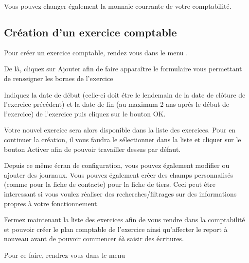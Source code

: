 \documentclass[a4paper,10pt,oneside,french]{sphinxmanual}
\begin{document}
Vous pouvez changer également la monnaie courrante de votre comptabilité.


\subsection{Création d’un exercice comptable}
\label{\detokenize{accounting/fiscalyear:creation-d-un-exercice-comptable}}
Pour créer un exercice comptable, rendez vous dans le menu .
\begin{quote}

\noindent{}
\end{quote}

De là, cliquez sur Ajouter afin de faire apparaître le formulaire vous permettant de renseigner les bornes de l’exercice
\begin{quote}

\noindent{}
\end{quote}

Indiquez la date de début (celle-ci doit étre le lendemain de la date
de clôture de l’exercice précédent) et la date de fin (au maximum 2 ans
aprés le début de l’exercice) de l’exercice puis cliquez sur le bouton
OK.

Votre nouvel exercice sera alors disponible dans la
liste des exercices. Pour en continuer la création, il vous faudra le
sélectionner dans la liste et cliquer sur le bouton Activer afin de
pouvoir travailler dessus par défaut.

Depuis ce même écran de configuration, vous pouvez également modifier
ou ajouter des journaux.
Vous pouvez également créer des champs personnalisés (comme pour la fiche de contacte)
pour la fiche de tiers. Ceci peut être interessant si vous voulez réaliser des recherches/filtrages
sur des informations propres à votre fonctionnement.

Fermez maintenant la liste des exercices afin de vous rendre dans la comptabilité et
pouvoir créer le plan comptable de l’exercice ainsi qu’affecter le
report à nouveau avant de pouvoir commencer éà saisir des écritures.

Pour ce faire, rendrez-vous dans le menu 
\begin{quote}

\noindent{}
\end{quote}
\end{document}
